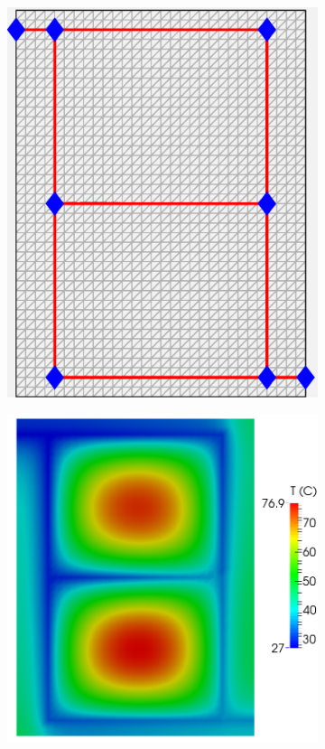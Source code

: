\documentclass[11pt,letterpaper]{article}
\begin{document}
\begin{figure}[!h]
\begin{subfigure}{0.28\textwidth}
\includegraphics[width=\linewidth]{parallelTwo_reference_30x40_mesh.eps}
\caption{}
\end{subfigure}
\begin{subfigure}{0.35\textwidth}
\includegraphics[width=\linewidth]{parallelTwoRefT.png}

\end{subfigure}
\end{figure}
\end{document}
